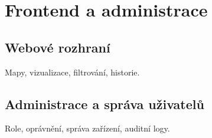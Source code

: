 \chapter{Frontend a administrace}
\label{chap:frontend-admin}

\section{Webové rozhraní}
Mapy, vizualizace, filtrování, historie.

\section{Administrace a správa uživatelů}
Role, oprávnění, správa zařízení, auditní logy.
